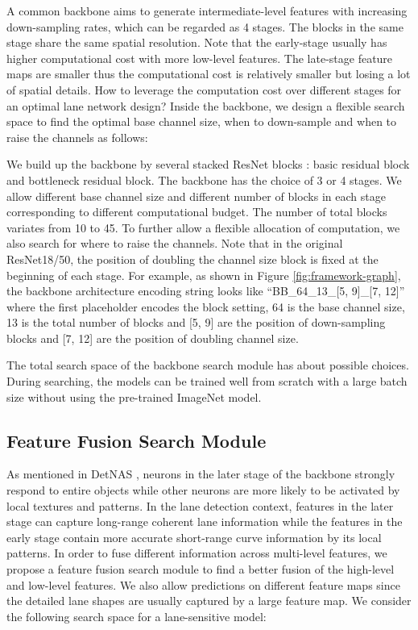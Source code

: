 \documentclass[runningheads]{llncs}
\begin{document}
A common backbone aims to generate intermediate-level features with
increasing down-sampling rates, which can be regarded as 4 stages.
The blocks in the same stage share the same spatial resolution. Note
that the early-stage usually has higher computational cost with more
low-level features. The late-stage feature maps are smaller thus the
computational cost is relatively smaller but losing a lot of spatial
details. How to leverage the computation cost over different stages
for an optimal lane network design? Inside the backbone, we design
a flexible search space to find the optimal base channel size, when
to down-sample and when to raise the channels as follows:

We build up the backbone by several stacked ResNet blocks \cite{he2016deep}:
basic residual block and bottleneck residual block. The backbone has
the choice of 3 or 4 stages. We allow different base channel size
 and different number of blocks in each stage
corresponding to different computational budget. The number of total
blocks variates from 10 to 45. To further allow a flexible allocation
of computation, we also search for where to raise the channels. Note
that in the original ResNet18/50, the position of doubling the channel
size block is fixed at the beginning of each stage. For example, as
shown in Figure \ref{fig:framework-graph}, the backbone architecture
encoding string looks like ``BB\_64\_13\_{[}5, 9{]}\_{[}7, 12{]}''
where the first placeholder encodes the block setting, 64 is the base
channel size, 13 is the total number of blocks and {[}5, 9{]} are
the position of down-sampling blocks and {[}7, 12{]} are the position
of doubling channel size. 

The total search space of the backbone search module has about 
possible choices. During searching, the models can be trained well
from scratch with a large batch size without using the pre-trained
ImageNet model. 

\subsection{Feature Fusion Search Module}

As mentioned in DetNAS \cite{chen2019detnas}, neurons in the later
stage of the backbone strongly respond to entire objects while other
neurons are more likely to be activated by local textures and patterns.
In the lane detection context, features in the later stage can capture
long-range coherent lane information while the features in the early
stage contain more accurate short-range curve information by its local
patterns. In order to fuse different information across multi-level
features, we propose a feature fusion search module to find a better
fusion of the high-level and low-level features. We also allow predictions
on different feature maps since the
detailed lane shapes are usually captured by a large feature map.
We consider the following search space for a lane-sensitive model:
\end{document}
